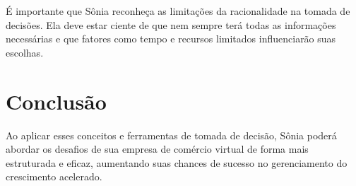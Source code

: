 \documentclass[11pt]{article}
\begin{document}
É importante que Sônia reconheça as limitações da racionalidade na tomada de decisões. Ela deve estar ciente de que nem sempre terá todas as informações necessárias e que fatores como tempo e recursos limitados influenciarão suas escolhas.

\section{Conclusão}

Ao aplicar esses conceitos e ferramentas de tomada de decisão, Sônia poderá abordar os desafios de sua empresa de comércio virtual de forma mais estruturada e eficaz, aumentando suas chances de sucesso no gerenciamento do crescimento acelerado.
\end{document}

